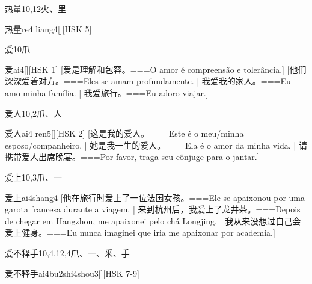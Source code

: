 \begin{Entry}{热量}{10,12}{⽕、⾥}
  \begin{Phonetics}{热量}{re4 liang4}[][HSK 5]
  \end{Phonetics}
\end{Entry}

\begin{Entry}{爱}{10}{⽖}
  \begin{Phonetics}{爱}{ai4}[][HSK 1]
    [爱是理解和包容。===O amor é compreensão e tolerância.]
    [他们深深爱着对方。===Eles se amam profundamente. | 我爱我的家人。===Eu amo minha família. | 我爱旅行。===Eu adoro viajar.]
  \end{Phonetics}
\end{Entry}

\begin{Entry}{爱人}{10,2}{⽖、⼈}
  \begin{Phonetics}{爱人}{ai4 ren5}[][HSK 2]
    [这是我的爱人。===Este é o meu/minha esposo/companheiro. | 她是我一生的爱人。===Ela é o amor da minha vida. | 请携带爱人出席晚宴。===Por favor, traga seu cônjuge para o jantar.]
  \end{Phonetics}
\end{Entry}

\begin{Entry}{爱上}{10,3}{⽖、⼀}
  \begin{Phonetics}{爱上}{ai4shang4}
    [他在旅行时爱上了一位法国女孩。===Ele se apaixonou por uma garota francesa durante a viagem.  | 来到杭州后，我爱上了龙井茶。===Depois de chegar em Hangzhou, me apaixonei pelo chá Longjing. | 我从来没想过自己会爱上健身。===Eu nunca imaginei que iria me apaixonar por academia.]
  \end{Phonetics}
\end{Entry}

\begin{Entry}{爱不释手}{10,4,12,4}{⽖、⼀、⾤、⼿}
  \begin{Phonetics}{爱不释手}{ai4bu2shi4shou3}[][HSK 7-9]
  \end{Phonetics}
\end{Entry}

